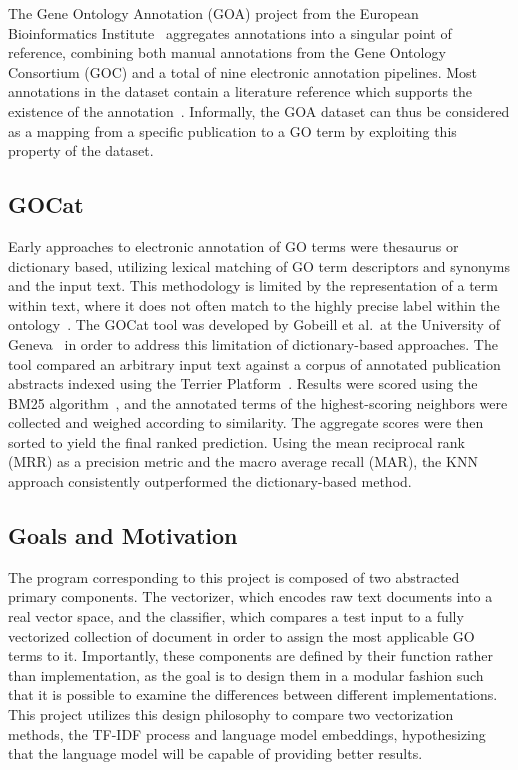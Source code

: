 \documentclass[11pt]{article}
\theoremstyle{plain}
\theoremstyle{definition}
\begin{document}
The Gene Ontology Annotation (GOA) project from the European Bioinformatics Institute~\cite{huntley/2014/database} aggregates annotations into a singular point of reference, combining both manual annotations from the Gene Ontology Consortium (GOC) and a total of nine electronic annotation pipelines. Most annotations in the dataset contain a literature reference which supports the existence of the annotation~\cite{hill/2008/gene}. Informally, the GOA dataset can thus be considered as a mapping from a specific publication to a GO term by exploiting this property of the dataset.

\subsection{GOCat}\label{sec:introduction-gocat}

Early approaches to electronic annotation of GO terms were thesaurus or dictionary based, utilizing lexical matching of GO term descriptors and synonyms and the input text. This methodology is limited by the representation of a term within text, where it does not often match to the highly precise label within the ontology~\cite{gobeill/2013/managing}. The GOCat tool was developed by Gobeill et al.\ at the University of Geneva~\cite{gobeill/2013/managing} in order to address this limitation of dictionary-based approaches. The tool compared an arbitrary input text against a corpus of annotated publication abstracts indexed using the Terrier Platform~\cite{ounis/2006/terrier}. Results were scored using the BM25 algorithm~\cite{amati/2009/bm}, and the annotated terms of the highest-scoring neighbors were collected and weighed according to similarity. The aggregate scores were then sorted to yield the final ranked prediction. Using the mean reciprocal rank (MRR) as a precision metric and the macro average recall (MAR), the KNN approach consistently outperformed the dictionary-based method.

\subsection{Goals and Motivation}\label{sec:introduction-aims}

The program corresponding to this project is composed of two abstracted primary components. The vectorizer, which encodes raw text documents into a real vector space, and the classifier, which compares a test input to a fully vectorized collection of document in order to assign the most applicable GO terms to it. Importantly, these components are defined by their function rather than implementation, as the goal is to design them in a modular fashion such that it is possible to examine the differences between different implementations. This project utilizes this design philosophy to compare two vectorization methods, the TF-IDF process and language model embeddings, hypothesizing that the language model will be capable of providing better results.
\end{document}
